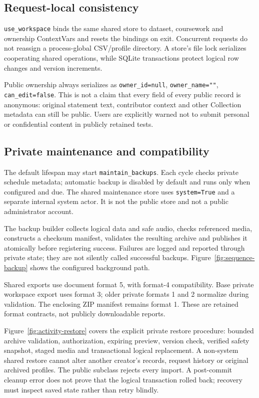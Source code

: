 \documentclass[11pt,a4paper]{article}
\begin{document}
\subsection{Request-local consistency}
\texttt{use\_workspace} binds the same shared store to dataset, coursework and
ownership ContextVars and resets the bindings on exit. Concurrent requests do
not reassign a process-global CSV/profile directory. A store's file lock
serializes cooperating shared operations, while SQLite transactions protect
logical row changes and version increments.

Public ownership always serializes as \texttt{owner\_id=null},
\texttt{owner\_name=""}, \texttt{can\_edit=false}. This is not a claim that every
field of every public record is anonymous: original statement text, contributor
context and other Collection metadata can still be public. Users are explicitly
warned not to submit personal or confidential content in publicly retained tests.

\subsection{Private maintenance and compatibility}
The default lifespan may start \texttt{maintain\_backups}. Each cycle checks
private schedule metadata; automatic backup is disabled by default and runs
only when configured and due. The shared maintenance store uses
\texttt{system=True} and a separate internal system actor. It is not the public
store and not a public administrator account.

The backup builder collects logical data and safe audio, checks referenced
media, constructs a checksum manifest, validates the resulting archive and
publishes it atomically before registering success. Failures are logged and
reported through private state; they are not silently called successful
backups. Figure~\ref{fig:sequence-backup} shows the configured background path.

Shared exports use document format 5, with format-4 compatibility. Base private
workspace export uses format 3; older private formats 1 and 2 normalize during
validation. The enclosing ZIP manifest remains format 1. These are retained
format contracts, not publicly downloadable reports.

Figure~\ref{fig:activity-restore} covers the explicit private restore procedure:
bounded archive validation, authorization, expiring preview, version check,
verified safety snapshot, staged media and transactional logical replacement.
A non-system shared restore cannot alter another creator's records, request
history or original archived profiles. The public subclass rejects every import.
A post-commit cleanup error does not prove that the logical transaction rolled
back; recovery must inspect saved state rather than retry blindly.
\end{document}

